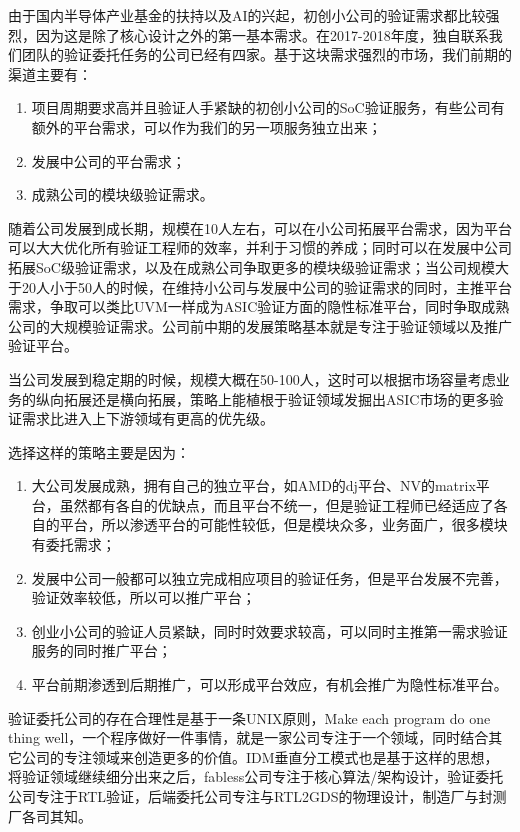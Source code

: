 \documentclass[a4paper,11pt]{article}
\begin{document}
由于国内半导体产业基金的扶持以及AI的兴起，初创小公司的验证需求都比较强烈，因为这是除了核心设计之外的第一基本需求。在2017-2018年度，独自联系我们团队的验证委托任务的公司已经有四家。基于这块需求强烈的市场，我们前期的渠道主要有：
\begin{enumerate}
\item 项目周期要求高并且验证人手紧缺的初创小公司的SoC验证服务，有些公司有额外的平台需求，可以作为我们的另一项服务独立出来；
\item 发展中公司的平台需求；
\item 成熟公司的模块级验证需求。
\end{enumerate}

随着公司发展到成长期，规模在10人左右，可以在小公司拓展平台需求，因为平台可以大大优化所有验证工程师的效率，并利于习惯的养成；同时可以在发展中公司拓展SoC级验证需求，以及在成熟公司争取更多的模块级验证需求；当公司规模大于20人小于50人的时候，在维持小公司与发展中公司的验证需求的同时，主推平台需求，争取可以类比UVM一样成为ASIC验证方面的隐性标准平台，同时争取成熟公司的大规模验证需求。公司前中期的发展策略基本就是专注于验证领域以及推广验证平台。

当公司发展到稳定期的时候，规模大概在50-100人，这时可以根据市场容量考虑业务的纵向拓展还是横向拓展，策略上能植根于验证领域发掘出ASIC市场的更多验证需求比进入上下游领域有更高的优先级。

选择这样的策略主要是因为：
\begin{enumerate}
\item 大公司发展成熟，拥有自己的独立平台，如AMD的dj平台、NV的matrix平台，虽然都有各自的优缺点，而且平台不统一，但是验证工程师已经适应了各自的平台，所以渗透平台的可能性较低，但是模块众多，业务面广，很多模块有委托需求；
\item 发展中公司一般都可以独立完成相应项目的验证任务，但是平台发展不完善，验证效率较低，所以可以推广平台；
\item 创业小公司的验证人员紧缺，同时时效要求较高，可以同时主推第一需求验证服务的同时推广平台；
\item 平台前期渗透到后期推广，可以形成平台效应，有机会推广为隐性标准平台。
\end{enumerate}

验证委托公司的存在合理性是基于一条UNIX原则，Make each program do one thing well，一个程序做好一件事情，就是一家公司专注于一个领域，同时结合其它公司的专注领域来创造更多的价值。IDM垂直分工模式也是基于这样的思想，将验证领域继续细分出来之后，fabless公司专注于核心算法/架构设计，验证委托公司专注于RTL验证，后端委托公司专注与RTL2GDS的物理设计，制造厂与封测厂各司其知。
\end{document}
